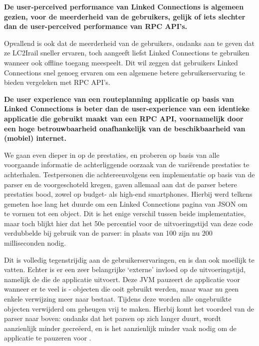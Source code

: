 \textbf{De user-perceived performance van Linked Connections is algemeen gezien, voor de meerderheid van de gebruikers, gelijk of iets slechter dan de user-perceived performance van RPC API's.}

Opvallend is ook dat de meerderheid van de gebruikers, ondanks aan te geven dat ze LC2Irail sneller ervaren, toch aangeeft liefst Linked Connections te gebruiken wanneer ook offline toegang meespeelt. Dit wil zeggen dat gebruikers Linked Connections snel genoeg ervaren om een algemene betere gebruikerservaring te bieden vergeleken met RPC API's.

\textbf{De user experience van een routeplanning applicatie op basis van Linked Connections is beter dan de user-experience van een identieke applicatie die gebruikt maakt van een RPC API, voornamelijk door een hoge betrouwbaarheid onafhankelijk van de beschikbaarheid van (mobiel) internet.}

We gaan even dieper in op de prestaties, en proberen op basis van alle voorgaande informatie de achterliggende oorzaak van de variërende prestaties te achterhalen. Testpersonen die achtereenvolgens een implementatie op basis van de  parser en de  voorgeschoteld kregen, gaven allemaal aan dat de  parser betere prestaties bood, zowel op budget- als high-end smartphones. Hierbij werd telkens gemeten hoe lang het duurde om een Linked Connections pagina van JSON om te vormen tot een object. Dit is het enige verschil tussen beide implementaties, maar toch blijkt hier dat het 50e percentiel voor de uitvoeringstijd van deze code verdubbelde bij gebruik van de  parser: in plaats van 100 zijn nu 200 milliseconden nodig.

Dit is volledig tegenstrijdig aan de gebruikerservaringen, en is dan ook moeilijk te vatten. Echter is er een zeer belangrijke `externe' invloed op de uitvoeringstijd, namelijk de  die de applicatie uitvoert. Deze JVM pauzeert de applicatie voor  wanneer er te veel  is - objecten die ooit gebruikt werden, maar waar nu geen enkele verwijzing meer naar bestaat. Tijdens deze  worden alle ongebruikte objecten verwijderd om geheugen vrij te maken. Hierbij komt het voordeel van de  parser naar boven: ondanks dat het parsen op zich langer duurt, wordt aanzienlijk minder  gecreëerd, en is het aanzienlijk minder vaak nodig om de applicatie te pauzeren voor .

